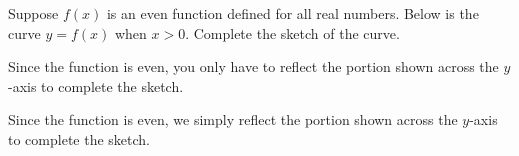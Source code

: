 \begin{question}
Suppose $f(x)$ is an even function defined for all real numbers. Below is the curve $y=f(x)$ when $x>0$. Complete the sketch of the curve.
\begin{center}\end{center}
\end{question}
\begin{hint}
Since the function is even, you only have to reflect the portion shown across the $y$-axis to complete the sketch.
\end{hint}
\begin{answer}
\begin{center}\end{center}
\end{answer}
\begin{solution}
Since the function is even, we simply reflect the portion shown across the $y$-axis to complete the sketch.
\begin{center}\end{center}
\end{solution}


